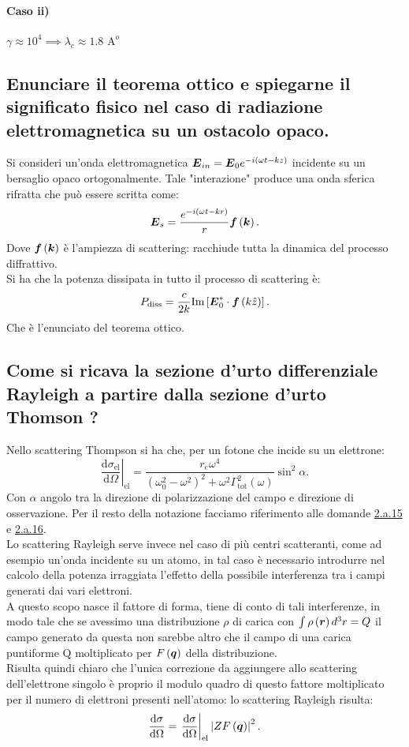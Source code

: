 \paragraph{Caso ii)}	$\gamma\approx 10^4 \implies \lambda_{c}\approx 1.8 \text{ A}^o $


\subsection[]{Enunciare il teorema ottico e spiegarne il significato fisico nel caso di radiazione elettromagnetica su un ostacolo opaco.}
\label{sec:3.b.25}
Si consideri un'onda elettromagnetica $\boldsymbol{E}_{in}= \boldsymbol{E}_{0}e^{-i\left( \omega t - kz \right) }$ incidente su un bersaglio opaco ortogonalmente. Tale "interazione" produce una onda sferica rifratta che può essere scritta come:
\[
	\boldsymbol{E}_s= \frac{e^{-i\left( \omega t - kr \right) }}{r}\boldsymbol{f}\left( \boldsymbol{k} \right) 
.\] 
Dove $\boldsymbol{f}\left( \boldsymbol{k} \right) $ è l'ampiezza di scattering: racchiude tutta la dinamica del processo diffrattivo.\\
Si ha che la potenza dissipata in tutto il processo di scattering è:
\[
	P_{\text{diss}}= \frac{c}{2k} \text{Im}\left[ \boldsymbol{E}^*_{0}\cdot \boldsymbol{f}\left( k \hat{z} \right)   \right] 
.\] 
Che è l'enunciato del teorema ottico.

\subsection[]{Come si ricava la sezione d'urto differenziale Rayleigh a partire dalla sezione d'urto Thomson ?}
\label{sec:3.b.26}
Nello scattering Thompson si ha che, per un fotone che incide su un elettrone:
\[
	\left.\frac{\mbox{d} \sigma_{\text{el}}}{\mbox{d} \Omega}\right|_{\text{el}} =  \frac{r_e\omega^4}{\left( \omega^2_0-\omega^2 \right)^2 + \omega^2\Gamma^2_{\text{tot}}\left( \omega \right)} \sin^2\alpha
.\] 
Con $\alpha$ angolo tra la direzione di polarizzazione del campo e direzione di osservazione. Per il resto della notazione facciamo riferimento alle domande \hyperref[subsec: 2.a.15]{2.a.15} e \hyperref[subsec: 2.a.16]{2.a.16}. \\
Lo scattering Rayleigh serve invece nel caso di più centri scatteranti, come ad esempio un'onda incidente su un atomo, in tal caso è necessario introdurre nel calcolo della potenza irraggiata l'effetto della possibile interferenza tra i campi generati dai vari elettroni.\\
A questo scopo nasce il fattore di forma, tiene di conto di tali interferenze, in modo tale che se avessimo una distribuzione $\rho$ di carica con $\int \rho\left( \boldsymbol{r}\right)d^3r=Q$ il campo generato da questa non sarebbe altro che il campo di una carica puntiforme Q moltiplicato per $F\left( \boldsymbol{q} \right) $ della distribuzione.\\
Risulta quindi chiaro che l'unica correzione da aggiungere allo scattering dell'elettrone singolo è proprio il modulo quadro di questo fattore moltiplicato per il numero di elettroni presenti nell'atomo: lo scattering Rayleigh risulta:
\[
	\frac{\mbox{d} \sigma}{\mbox{d} \Omega} = \left.\frac{\mbox{d} \sigma}{\mbox{d} \Omega}  \right|_{\text{el}}\left| ZF\left( \boldsymbol{q} \right)  \right| ^2
.\] 




